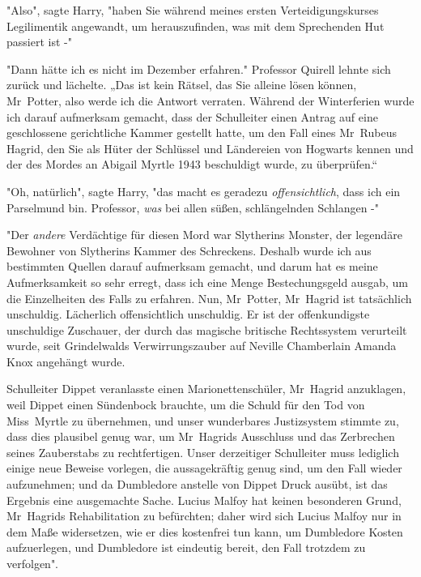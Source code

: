 {"Also", sagte Harry, "haben Sie während meines ersten Verteidigungskurses Legilimentik angewandt, um herauszufinden, was mit dem Sprechenden Hut passiert ist -"

"Dann hätte ich es nicht im Dezember erfahren." Professor Quirell lehnte sich zurück und lächelte. „Das ist kein Rätsel, das Sie alleine lösen können, Mr~Potter, also werde ich die Antwort verraten. Während der Winterferien wurde ich darauf aufmerksam gemacht, dass der Schulleiter einen Antrag auf eine geschlossene gerichtliche Kammer gestellt hatte, um den Fall eines Mr~Rubeus Hagrid, den Sie als Hüter der Schlüssel und Ländereien von Hogwarts kennen und der des Mordes an Abigail Myrtle 1943 beschuldigt wurde, zu überprüfen.“

"Oh, natürlich", sagte Harry, "das macht es geradezu \emph{offensichtlich}, dass ich ein Parselmund bin. Professor, \emph{was} bei allen süßen, schlängelnden Schlangen -"

"Der \emph{andere} Verdächtige für diesen Mord war Slytherins Monster, der legendäre Bewohner von Slytherins Kammer des Schreckens. Deshalb wurde ich aus bestimmten Quellen darauf aufmerksam gemacht, und darum hat es meine Aufmerksamkeit so sehr erregt, dass ich eine Menge Bestechungsgeld ausgab, um die Einzelheiten des Falls zu erfahren. Nun, Mr~Potter, Mr~Hagrid ist tatsächlich unschuldig. Lächerlich offensichtlich unschuldig. Er ist der offenkundigste unschuldige Zuschauer, der durch das magische britische Rechtssystem verurteilt wurde, seit Grindelwalds Verwirrungszauber auf Neville Chamberlain Amanda Knox angehängt wurde.

Schulleiter Dippet veranlasste einen Marionettenschüler, Mr~Hagrid anzuklagen, weil Dippet einen Sündenbock brauchte, um die Schuld für den Tod von Miss~Myrtle zu übernehmen, und unser wunderbares Justizsystem stimmte zu, dass dies plausibel genug war, um Mr~Hagrids Ausschluss und das Zerbrechen seines Zauberstabs zu rechtfertigen. Unser derzeitiger Schulleiter muss lediglich einige neue Beweise vorlegen, die aussagekräftig genug sind, um den Fall wieder aufzunehmen; und da Dumbledore anstelle von Dippet Druck ausübt, ist das Ergebnis eine ausgemachte Sache. Lucius Malfoy hat keinen besonderen Grund, Mr~Hagrids Rehabilitation zu befürchten; daher wird sich Lucius Malfoy nur in dem Maße widersetzen, wie er dies kostenfrei tun kann, um Dumbledore Kosten aufzuerlegen, und Dumbledore ist eindeutig bereit, den Fall trotzdem zu verfolgen".

}
